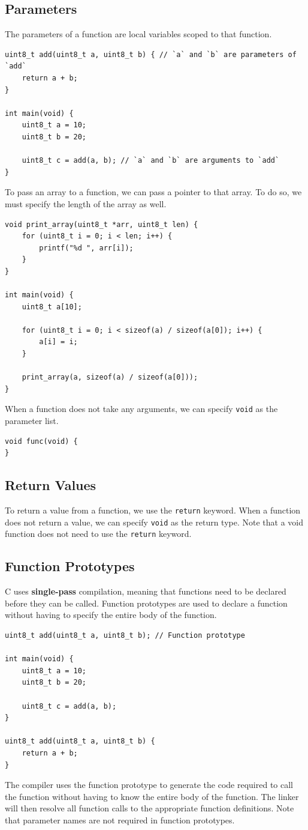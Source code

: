 \documentclass{report}
\begin{document}
\subsection{Parameters}
The parameters of a function are local variables scoped to that function.
\begin{verbatim}
uint8_t add(uint8_t a, uint8_t b) { // `a` and `b` are parameters of `add`
    return a + b;
}

int main(void) {
    uint8_t a = 10;
    uint8_t b = 20;

    uint8_t c = add(a, b); // `a` and `b` are arguments to `add`
}
\end{verbatim}
To pass an array to a function, we can pass a pointer to that array.
To do so, we must specify the length of the array as well.
\begin{verbatim}
void print_array(uint8_t *arr, uint8_t len) {
    for (uint8_t i = 0; i < len; i++) {
        printf("%d ", arr[i]);
    }
}

int main(void) {
    uint8_t a[10];

    for (uint8_t i = 0; i < sizeof(a) / sizeof(a[0]); i++) {
        a[i] = i;
    }

    print_array(a, sizeof(a) / sizeof(a[0]));
}
\end{verbatim}
When a function does not take any arguments, we can specify \texttt{void} as the parameter list.
\begin{verbatim}
void func(void) {
}
\end{verbatim}
\subsection{Return Values}
To return a value from a function, we use the \texttt{return} keyword.
When a function does not return a value, we can specify \texttt{void} as the return type.
Note that a void function does not need to use the \texttt{return} keyword.
\subsection{Function Prototypes}
C uses \textbf{single-pass} compilation, meaning that functions
need to be declared before they can be called.
Function prototypes are used to declare a function without having to specify the
entire body of the function.
\begin{verbatim}
uint8_t add(uint8_t a, uint8_t b); // Function prototype

int main(void) {
    uint8_t a = 10;
    uint8_t b = 20;

    uint8_t c = add(a, b);
}

uint8_t add(uint8_t a, uint8_t b) {
    return a + b;
}
\end{verbatim}
The compiler uses the function prototype to generate the code required
to call the function without having to know the entire body of the function.
The linker will then resolve all function calls to the appropriate function
definitions. Note that parameter names are not required in function prototypes.
\end{document}
